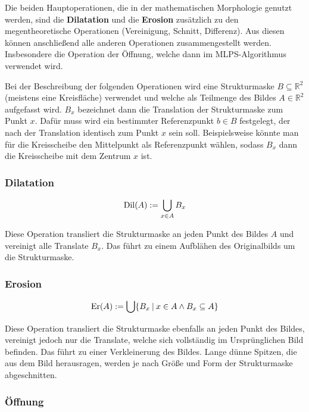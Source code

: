\documentclass{article}
\newcommand{\R}[0]{\mathbb{R}}
\theoremstyle{plain}
\theoremstyle{definition}
\begin{document}
Die beiden Hauptoperationen, die in der mathematischen Morphologie genutzt werden, sind die \textbf{Dilatation} und die \textbf{Erosion} zusätzlich zu den megentheoretische Operationen (Vereinigung, Schnitt, Differenz).
Aus diesen können anschließend alle anderen Operationen zusammengestellt werden. Insbesondere die Operation der Öffnung, welche dann im MLPS-Algorithmus verwendet wird.


Bei der Beschreibung der folgenden Operationen wird eine Strukturmaske $B \subseteq \R^2$ (meistens eine Kreisfläche) verwendet und welche als Teilmenge des Bildes $A \in \R^2$ aufgefasst wird.
$B_x$ bezeichnet dann die Translation der Strukturmaske zum Punkt $x$. Dafür muss wird ein bestimmter Referenzpunkt $b \in B$ festgelegt, der nach der Translation identisch zum Punkt $x$ sein soll.
Beispielsweise könnte man für die Kreisscheibe den Mittelpunkt als Referenzpunkt wählen, sodass $B_x$ dann die Kreisscheibe mit dem Zentrum $x$ ist.

\subsubsection{Dilatation}
\begin{equation}
    {\rm Dil}(A) := \bigcup\limits_{x \in A} B_x
\end{equation}

Diese Operation transliert die Strukturmaske an jeden Punkt des Bildes $A$ und vereinigt alle Translate $B_x$. Das führt zu einem Aufblähen des Originalbilds um die Strukturmaske.

\subsubsection{Erosion}
\begin{equation}
    {\rm Er}(A) := \bigcup \{B_x \: | \: x \in A \land B_x \subseteq A\}
\end{equation}

Diese Operation transliert die Strukturmaske ebenfalls an jeden Punkt des Bildes, vereinigt jedoch nur die Translate, welche sich vollständig im Ursprünglichen Bild befinden.
Das führt zu einer Verkleinerung des Bildes. Lange dünne Spitzen, die aus dem Bild herausragen, werden je nach Größe und Form der Strukturmaske abgeschnitten.

\subsubsection{Öffnung}
\end{document}
